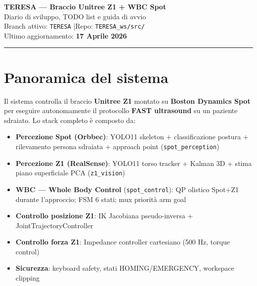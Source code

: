 \documentclass[a4paper,11pt]{article}
\begin{document}
\begin{center}
  {\LARGE \textbf{TERESA — Braccio Unitree Z1 + WBC Spot}}\\[4pt]
  {\large Diario di sviluppo, TODO list e guida di avvio}\\[2pt]
  {\small
    Branch attivo:
    \textcolor{branchpurple}{\texttt{TERESA}}
    \quad|\quad Repo: \texttt{TERESA\_ws/src/}}\\[2pt]
  {\small Ultimo aggiornamento: \textbf{17 Aprile 2026}}
\end{center}
\vspace{0.5em}
\hrule
\vspace{1em}

\section{Panoramica del sistema}

Il sistema controlla il braccio \textbf{Unitree Z1} montato su \textbf{Boston Dynamics Spot}
per eseguire autonomamente il protocollo \textbf{FAST ultrasound} su un paziente sdraiato.
Lo stack completo è composto da:

\begin{itemize}
  \item \textbf{Percezione Spot (Orbbec)}: YOLO11 skeleton + classificazione postura +
        rilevamento persona sdraiata + approach point (\texttt{spot\_perception})
  \item \textbf{Percezione Z1 (RealSense)}: YOLO11 torso tracker + Kalman 3D +
        stima piano superficiale PCA (\texttt{z1\_vision})
  \item \textbf{WBC — Whole Body Control} (\texttt{spot\_control}):
        QP olistico Spot+Z1 durante l'approccio; FSM 6 stati; mux priorità arm goal
  \item \textbf{Controllo posizione Z1}: IK Jacobiana pseudo-inversa + JointTrajectoryController
  \item \textbf{Controllo forza Z1}: Impedance controller cartesiano (500 Hz, torque control)
  \item \textbf{Sicurezza}: keyboard safety, stati HOMING/EMERGENCY, workspace clipping
\end{itemize}
\end{document}
